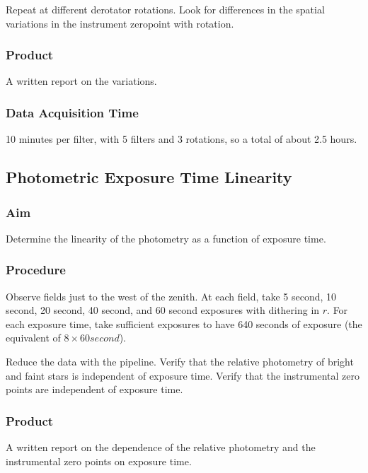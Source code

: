 \documentclass{article}
\begin{document}
Repeat at different derotator rotations. Look for differences in the spatial variations in the instrument zeropoint with rotation.

\subsubsection{Product}

A written report on the variations.

\subsubsection{Data Acquisition Time}

10 minutes per filter, with 5 filters and 3 rotations, so a total of about 2.5 hours.


\subsection{Photometric Exposure Time Linearity}

\subsubsection{Aim}

Determine the linearity of the photometry as a function of exposure time.

\subsubsection{Procedure}

Observe fields just to the west of the zenith. At each field, take 5 second, 10 second, 20 second, 40 second, and 60 second exposures with dithering in $r$. For each exposure time, take sufficient exposures to have 640 seconds of exposure (the equivalent of $8 \times 60 second$).

Reduce the data with the pipeline. Verify that the relative photometry of bright and faint stars is independent of exposure time. Verify that the instrumental zero points are independent of exposure time.

\subsubsection{Product}

A written report on the dependence of the relative photometry and the instrumental zero points on exposure time.
\end{document}
